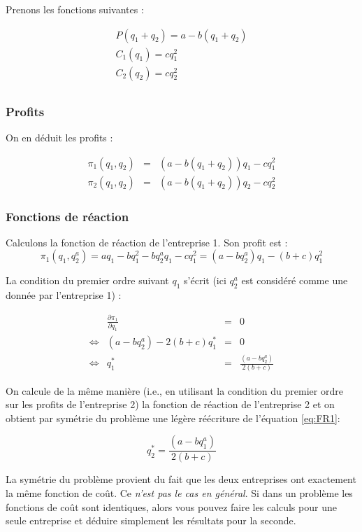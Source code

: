 \documentclass[
]{book}
\theoremstyle{definition}
\theoremstyle{definition}
\theoremstyle{definition}
\theoremstyle{definition}
\theoremstyle{remark}
\begin{document}
Prenons les fonctions suivantes :

\[
\begin{array}{l}
P(q_1+q_2) = a - b(q_1+q_2)\\
C_1(q_1) = cq^2_1 \\
C_2(q_2) = cq^2_2 \\
\end{array}
\]

\hypertarget{profits}{%
\subsubsection{Profits}\label{profits}}

On en déduit les profits :

\[
\begin{array}{rcl}
\pi_1(q_1, q_2) &=& \left(a-b(q_1+q_2)\right)q_1-cq_1^2\\
\pi_2(q_1, q_2) &=& \left(a-b(q_1+q_2)\right)q_2-cq_2^2
\end{array}
\]

\hypertarget{fonctions-de-ruxe9action}{%
\subsubsection{Fonctions de réaction}\label{fonctions-de-ruxe9action}}

Calculons la fonction de réaction de l'entreprise 1.
Son profit est :
\[
\pi_1(q_1, q_2^a) = aq_1-bq_1^2-bq_2^aq_1-cq_1^2 = (a-bq_2^a)q_1-(b+c)q_1^2
\]

La condition du premier ordre suivant \(q_1\) s'écrit (ici \(q_2^a\) est considéré comme une donnée par l'entreprise 1) :

\[
\begin{array}{crcl}
&\frac{\partial \pi_1}{\partial q_1}&=&0\\
\Leftrightarrow & (a-bq_2^a)-2(b+c)q_1^* &=& 0\\
\Leftrightarrow & q_1^* &=& \frac{(a-bq_2^a)}{2(b+c)}
\label{eq:FR1}
\end{array}
\]

On calcule de la même manière (i.e., en utilisant la condition du premier ordre sur les profits de l'entreprise 2) la fonction de réaction de l'entreprise 2 et on obtient par symétrie du problème une légère réécriture de l'équation \eqref{eq:FR1}:

\[
q_2^* = \frac{(a-bq_1^a)}{2(b+c)}
\]

La symétrie du problème provient du fait que les deux entreprises ont exactement la même fonction de coût.
Ce \emph{n'est pas le cas en général}.
Si dans un problème les fonctions de coût sont identiques, alors vous pouvez faire les calculs pour une seule entreprise et déduire simplement les résultats pour la seconde.
\end{document}
